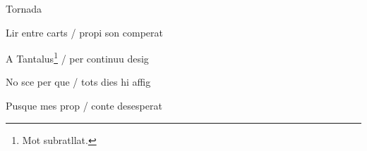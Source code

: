 \documentclass[12pt]{article}
\begin{document}
\begin{estrofaExtra}%




\begin{tornada}

Tornada

\end{tornada}


\end{estrofaExtra}


\begin{estrofa}

 Lir entre carts / propi son comperat

 A Tantalus\footnote{Mot subratllat.} / per continuu desig

 No sce per que / tots dies hi affig

 Pusque mes prop / conte desesperat

\end{estrofa}
\end{document}
